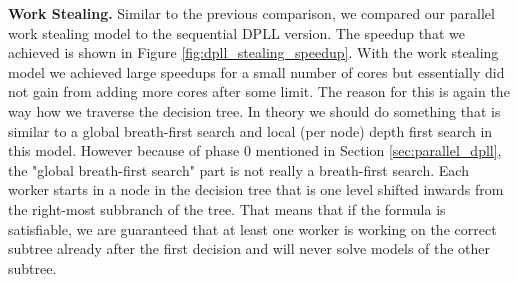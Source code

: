 \documentclass[letterpaper]{article}
\newcommand{\mypar}[1]{{\bf #1.}}
\begin{document}
\mypar{Work Stealing}
Similar to the previous comparison, we compared our parallel work stealing model to the sequential DPLL version.
The speedup that we achieved is shown in Figure \ref{fig:dpll_stealing_speedup}.
With the work stealing model we achieved large speedups for a small number of cores but essentially did not gain from adding more cores after some limit.
The reason for this is again the way how we traverse the decision tree.
In theory we should do something that is similar to a global breath-first search and local (per node) depth first search in this model.
However because of phase 0 mentioned in Section \ref{sec:parallel_dpll}, the "global breath-first search" part is not really a breath-first search.
Each worker starts in a node in the decision tree that is one level shifted inwards from the right-most subbranch of the tree.
That means that if the formula is satisfiable, we are guaranteed that at least one worker is working on the correct subtree already after the first decision and will never solve models of the other subtree.
\end{document}
